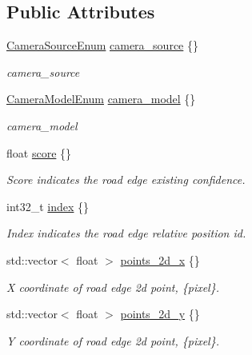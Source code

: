 \subsection*{Public Attributes}
\begin{DoxyCompactItemize}
\item 
\hyperlink{structmaf__perception__interface_1_1CameraSourceEnum}{Camera\+Source\+Enum} \hyperlink{structmaf__perception__interface_1_1RoadEdge_af3fbb61f1bbe16ac749ac1c522e6261b}{camera\+\_\+source} \{\}
\begin{DoxyCompactList}\small\item\em camera\+\_\+source \end{DoxyCompactList}\item 
\hyperlink{structmaf__perception__interface_1_1CameraModelEnum}{Camera\+Model\+Enum} \hyperlink{structmaf__perception__interface_1_1RoadEdge_ab403daf2a34a9c292d53de837d3b9831}{camera\+\_\+model} \{\}
\begin{DoxyCompactList}\small\item\em camera\+\_\+model \end{DoxyCompactList}\item 
float \hyperlink{structmaf__perception__interface_1_1RoadEdge_af02e987cda332fdb2e29e3897e520098}{score} \{\}
\begin{DoxyCompactList}\small\item\em Score indicates the road edge existing confidence. \end{DoxyCompactList}\item 
int32\+\_\+t \hyperlink{structmaf__perception__interface_1_1RoadEdge_ae73688eb555afeae94c720908b64b219}{index} \{\}
\begin{DoxyCompactList}\small\item\em Index indicates the road edge relative position id. \end{DoxyCompactList}\item 
std\+::vector$<$ float $>$ \hyperlink{structmaf__perception__interface_1_1RoadEdge_a023790b4049e9c0cb79625245894978b}{points\+\_\+2d\+\_\+x} \{\}
\begin{DoxyCompactList}\small\item\em X coordinate of road edge 2d point, \{pixel\}. \end{DoxyCompactList}\item 
std\+::vector$<$ float $>$ \hyperlink{structmaf__perception__interface_1_1RoadEdge_aec18b380c98310867e9d19878fd751f5}{points\+\_\+2d\+\_\+y} \{\}
\begin{DoxyCompactList}\small\item\em Y coordinate of road edge 2d point, \{pixel\}. \end{DoxyCompactList}\item 

\end{DoxyCompactItemize}
